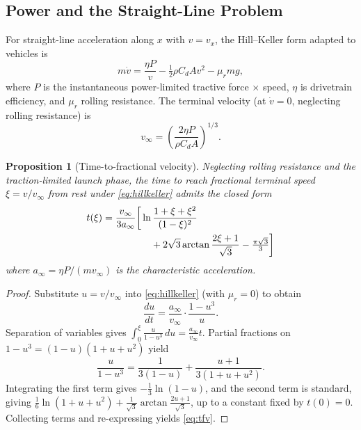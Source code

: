 \documentclass[11pt,twocolumn]{article}
\newtheorem{proposition}[theorem]{Proposition}
\theoremstyle{definition}
\theoremstyle{remark}
\begin{document}
\subsection{Power and the Straight-Line Problem}

For straight-line acceleration along $x$ with $v = v_x$, the Hill--Keller form \cite{hill1925muscular,keller1973theory,mureika2001phenomenological} adapted to vehicles is
\begin{equation}
m\dot{v} = \frac{\eta P}{v} - \tfrac{1}{2}\rho C_d A v^2 - \mu_r m g, \label{eq:hillkeller}
\end{equation}
where $P$ is the instantaneous power-limited tractive force $\times$ speed, $\eta$ is drivetrain efficiency, and $\mu_r$ rolling resistance. The terminal velocity (at $\dot v = 0$, neglecting rolling resistance) is
\begin{equation}
v_{\infty} = \left(\frac{2\eta P}{\rho C_d A}\right)^{1/3}. \label{eq:vterm}
\end{equation}

\begin{proposition}[Time-to-fractional velocity]\label{prop:tfv}
Neglecting rolling resistance and the traction-limited launch phase, the time to reach fractional terminal speed $\xi = v/v_{\infty}$ from rest under \eqref{eq:hillkeller} admits the closed form
\begin{align}
t(\xi) = \frac{v_{\infty}}{3 a_{\infty}} \bigg[&\ln\frac{1 + \xi + \xi^2}{(1-\xi)^2} \notag\\
&\quad + 2\sqrt{3}\arctan\frac{2\xi + 1}{\sqrt{3}} - \tfrac{\pi\sqrt{3}}{3}\bigg] \label{eq:tfv}
\end{align}
where $a_{\infty} = \eta P / (m v_{\infty})$ is the characteristic acceleration.
\end{proposition}

\begin{proof}
Substitute $u = v/v_{\infty}$ into \eqref{eq:hillkeller} (with $\mu_r = 0$) to obtain
\begin{equation}
\frac{du}{dt} = \frac{a_{\infty}}{v_{\infty}}\cdot\frac{1 - u^3}{u}.
\end{equation}
Separation of variables gives $\int_0^{\xi} \frac{u}{1-u^3}\,du = \frac{a_{\infty}}{v_{\infty}} t$. Partial fractions on $1 - u^3 = (1-u)(1 + u + u^2)$ yield
\begin{equation}
\frac{u}{1-u^3} = \frac{1}{3(1-u)} + \frac{u+1}{3(1+u+u^2)}.
\end{equation}
Integrating the first term gives $-\tfrac{1}{3}\ln(1-u)$, and the second term is standard, giving $\tfrac{1}{6}\ln(1+u+u^2) + \tfrac{1}{\sqrt{3}}\arctan\tfrac{2u+1}{\sqrt{3}}$, up to a constant fixed by $t(0) = 0$. Collecting terms and re-expressing yields \eqref{eq:tfv}.
\end{proof}
\end{document}
